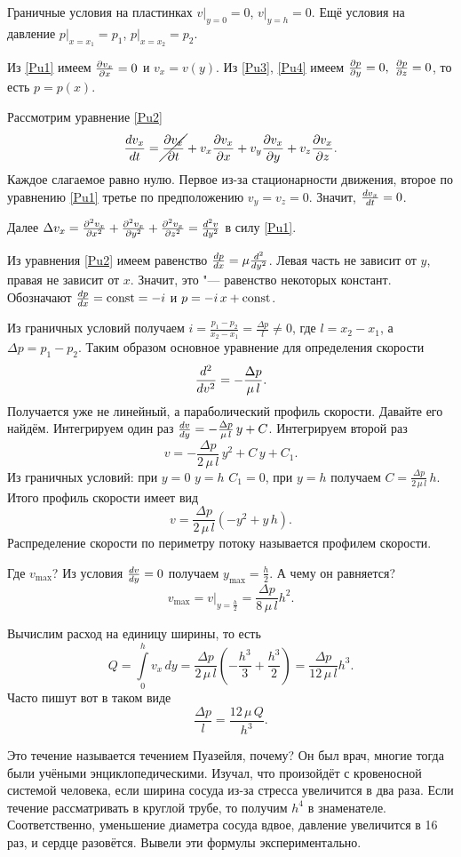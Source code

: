 Граничные условия на пластинках $v|_{y=0}=0$, $v|_{y=h}=0$. Ещё условия на давление $p|_{x=x_1}=p_1$, $p|_{x=x_2}=p_2$.

Из \eqref{Pu1} имеем $\frac{\partial v_x}{\partial x} = 0$ и $v_x = v(y)$.
Из \eqref{Pu3}, \eqref{Pu4} имеем $\frac{\partial p}{\partial y}=0,\ \frac{\partial p}{\partial z}=0$, то есть $p=p(x)$.

Рассмотрим уравнение \eqref{Pu2}
\[
  \frac{dv_x}{dt} = \cancel{\frac{\partial v_x}{\partial t}} + v_x\frac{\partial v_x}{\partial x} + v_y\frac{\partial v_x}{\partial y} + v_z\frac{\partial v_x}{\partial z}.
\]
Каждое слагаемое равно нулю. Первое из-за стационарности движения, второе по уравнению \eqref{Pu1} третье по предположению $v_y=v_z=0$. Значит, $\frac{dv_x}{dt}=0$.

Далее $\Delta v_x = \frac{\partial ^2v_x}{\partial x^2} + \frac{\partial ^2v_x}{\partial y^2} + \frac{\partial ^2v_x}{\partial z^2} = \frac{d^2v}{dy^2}$ в силу \eqref{Pu1}.


Из уравнения \eqref{Pu2} имеем равенство $\frac{dp}{dx} = \mu \frac{d^2}{dy^2}$. Левая часть не зависит от $y$, правая не зависит от $x$. Значит, это "--- равенство некоторых констант. Обозначают $\frac{dp}{dx} = \operatorname{const} = -i$ и $p = -i\,x+\operatorname{const}$.

Из граничных условий получаем $i=\frac{p_1-p_2}{x_2-x_1} = \frac{\Delta p}l\ne0$, где $l=x_2-x_1$, а $\Delta p = p_1-p_2$.
Таким образом основное уравнение для определения скорости
\[
  \frac{d^2}{dv^2} = -\frac{\Delta p}{\mu\,l}.
\]
Получается уже не линейный, а параболический профиль скорости. Давайте его найдём. Интегрируем один раз $\frac{dv}{dy} = -\frac{\Delta p}{\mu\,l}\,y + C$. Интегрируем второй раз
\[
  v= -\frac{\Delta p}{2\,\mu\,l}\,y^2 + C\, y + C_1.
\]
Из граничных условий: при $y=0$ $y=h$ $C_1=0$, при $y=h$ получаем $C = \frac{\Delta p}{2\,\mu\,l}\,h$. Итого профиль скорости имеет вид
\[
  v = \frac{\Delta p}{2\,\mu\,l}(-y^2 + y\,h).
\]
Распределение скорости по периметру потоку называется профилем скорости.

Где $v_{\max}$? Из условия $\frac{dv}{dy} = 0$ получаем $y_{\max} = \frac h2$. А чему он равняется?
\[
  v_{\max} = v|_{y=\frac h2} = \frac{\Delta p}{8\,\mu\,l} h^2.
\]

Вычислим расход на единицу ширины, то есть
\[
  Q = \int\limits_0^h v_x\,dy = \frac{\Delta p}{2\,\mu\,l}\left(-\frac{h^3}3 + \frac{h^3}2\right) = \frac{\Delta p}{12\,\mu\,l}h^3.
\]
Часто пишут вот в таком виде
\[
  \frac{\Delta p}l = \frac{12\,\mu\,Q}{h^3}.
\]

Это течение называется течением Пуазейля, почему? Он был врач, многие тогда были учёными энциклопедическими. Изучал, что произойдёт с кровеносной системой человека, если ширина сосуда из-за стресса увеличится в два раза. Если течение рассматривать в круглой трубе, то получим $h^4$ в знаменателе. Соответственно, уменьшение диаметра сосуда вдвое, давление увеличится в 16 раз, и сердце разовётся. Вывели эти формулы экспериментально.

